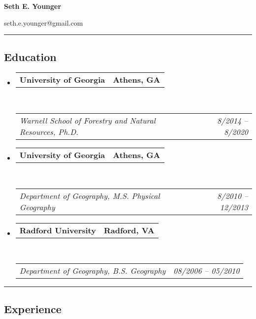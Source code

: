 \documentclass[10pt,letterpaper]{article}
\makeatletter
\newcommand{\headerrow}[2]
{\begin{tabular*}{\linewidth}{l@{\extracolsep{\fill}}r}
		#1 &
		#2 \\
\end{tabular*}}
\makeatother
\begin{document}
	
	\begin{center}
		{\LARGE \textbf{Seth E. Younger}}
		
		seth.e.younger@gmail.com\ \ %
	\end{center}
	
	\hrule
	\vspace{-0.4em}
	\subsection*{Education}
	
	\begin{itemize}
		\parskip=0.1em
		
		\item 
		\headerrow
		{\textbf{University of Georgia}}
		{\textbf{Athens, GA}}
		\\
		\headerrow
		{\emph{Warnell School of Forestry and Natural Resources, Ph.D.}}
		{\emph{8/2014 -- 8/2020}}
		
		\item 
		\headerrow
		{\textbf{University of Georgia}}
		{\textbf{Athens, GA}}
		\\
		\headerrow
		{\emph{Department of Geography, M.S. Physical Geography}}
		{\emph{8/2010 -- 12/2013}}
		
		\item 
		\headerrow
		{\textbf{Radford University}}
		{\textbf{Radford, VA}}
		\\
		\headerrow
		{\emph{Department of Geography, B.S. Geography}}
		{\emph{08/2006 -- 05/2010}}
		
	\end{itemize}
	
	\hrule
	\vspace{-0.4em}
	\subsection*{Experience}
	
\end{document}
